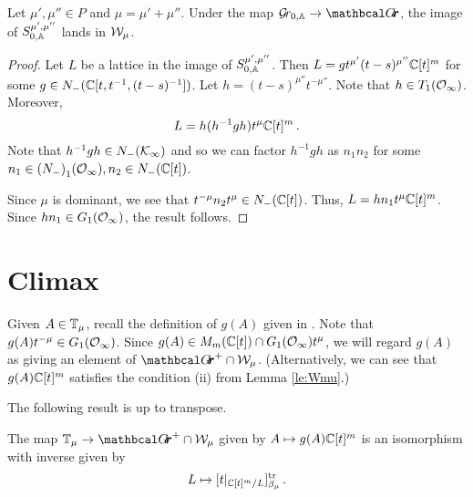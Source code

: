 \documentclass[draft]{article}
\begin{document}
% 
\begin{lemma}
    Let $\mu',\mu'' \in P$ and $\mu = \mu' + \mu''$. Under the map $ \Grbd \rightarrow \Grth$, the image of $ S^{\mu', \mu''}_{0,\AA}$ lands in $ \cW_\mu$.
\end{lemma}

\begin{proof}
    Let $ L $ 
    be a lattice in the image of $S^{\mu',\mu''}_{0,\AA}$. Then $ L = g t^{\mu'} (t-s)^{\mu''}\CC[t]^m$ for some $ g \in N_-(\CC[t, t^{-1}, (t-s)^{-1}]) $.  Let $ h =(t-s)^{\mu''} t^{-\mu''}  $.  Note that $ h \in T_1(\Oinf)$. 
    Moreover,
    $$ L = h (h^{-1} g h) t^{\mu}\CC[t]^m\,. $$
    Note that 
    $h^{-1} g h \in N_-(\cK_\infty)$ and so we can factor $ h^{-1} g h$ as $n_1 n_2$ for some $ n_1 \in {(N_-)}_1(\Oinf), n_2 \in {N_-}(\CC[t]) $. 
    
    Since $ \mu $ is dominant, we see that $ t^{-\mu} n_2 t^\mu \in N_-(\CC[t]) $. %
% 
% 
    Thus, $ L = h n_1 t^\mu \CC[t]^m$.  Since $ hn_1 \in G_1(\Oinf)$, the result follows. %
    \end{proof}

\section{Climax}
Given $ A \in \TT_\mu$, recall the definition of $ g(A)$ given in .  Note that $g(A)t^{-\mu} \in G_1(\Oinf)$.
Since $ g(A) \in M_m(\CC[t]) \cap G_1(\Oinf)t^\mu$, we will regard $ g(A)$ as giving an element of $ \Grth^+ \cap \cW_\mu$.  (Alternatively, we can see that $ g(A) \CC[t]^m$ satisfies the condition (ii) from Lemma \ref{le:Wmu}.)

The following result is \cite[Theorem 3.2]{cautis2018categorical} up to transpose.
% 
\begin{theorem} \label{th:TmuWmu}
The map $ \TT_\mu \rightarrow \Grth^+ \cap \cW_\mu $ given by $ A \mapsto g(A)\CC[t]^m $ is an isomorphism with inverse given by
$$ L \mapsto [t|_{\CC[t]^m/L} ]^{\tr}_{\beta_\mu} \,. $$
\end{theorem}
% 
\end{document}
